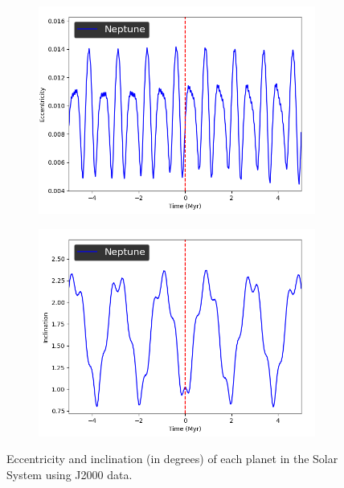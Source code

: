 \documentclass[11pt, oneside]{article}   	%
\begin{document}
\begin{figure}[!h]
	\ContinuedFloat
    \centering
    \begin{subfigure}[t]{0.49\textwidth}
    \captionsetup{width=0.9\textwidth}
	\centering
       	 \includegraphics[width=\textwidth]{Eccentricity_Neptune}
    \end{subfigure}
    \begin{subfigure}[t]{0.49\textwidth}
    \captionsetup{width=0.9\textwidth}
        	\centering
	\includegraphics[width=\textwidth]{Inclination_Neptune}
    \end{subfigure}
    \caption{Eccentricity and inclination (in degrees) of each planet in the Solar System using J2000 data.}
\end{figure}
\end{document}
